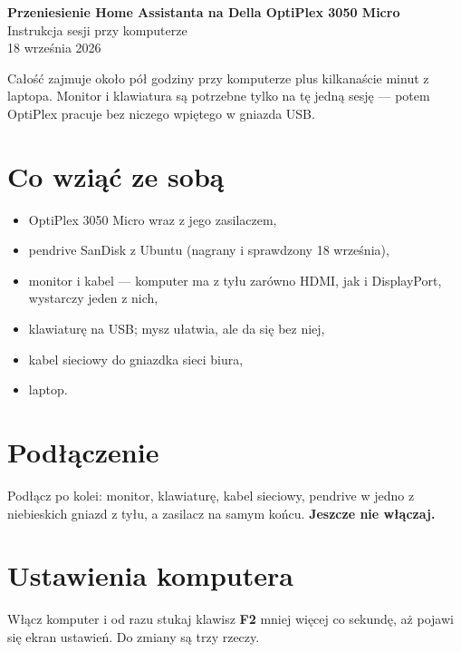 \documentclass[11pt,a4paper]{article}
\begin{document}
\begin{center}
{\LARGE\bfseries Przeniesienie Home Assistanta na Della OptiPlex 3050 Micro}\\[0.4em]
{\large Instrukcja sesji przy komputerze}\\[0.3em]
{\color{szary} 18 wrze\'snia 2026}
\end{center}

\vspace{0.6em}

\noindent
Ca\l{}o\'s\'c zajmuje oko\l{}o p\'o\l{} godziny przy komputerze plus kilkana\'scie minut z laptopa.
Monitor i klawiatura s\k{a} potrzebne tylko na t\k{e} jedn\k{a} sesj\k{e} --- potem OptiPlex pracuje
bez niczego wpi\k{e}tego w gniazda USB.

\section{Co wzi\k{a}\'c ze sob\k{a}}

\begin{itemize}
  \item OptiPlex 3050 Micro wraz z jego zasilaczem,
  \item pendrive SanDisk z Ubuntu (nagrany i sprawdzony 18 wrze\'snia),
  \item monitor i kabel --- komputer ma z ty\l{}u zar\'owno HDMI, jak i DisplayPort, wystarczy jeden z nich,
  \item klawiatur\k{e} na USB; mysz u\l{}atwia, ale da si\k{e} bez niej,
  \item kabel sieciowy do gniazdka sieci biura,
  \item laptop.
\end{itemize}

\section{Pod\l{}\k{a}czenie}

Pod\l{}\k{a}cz po kolei: monitor, klawiatur\k{e}, kabel sieciowy, pendrive w jedno z niebieskich gniazd
z ty\l{}u, a zasilacz na samym ko\'ncu. \textbf{Jeszcze nie w\l{}\k{a}czaj.}

\section{Ustawienia komputera}

W\l{}\k{a}cz komputer i od razu stukaj klawisz \textbf{F2} mniej wi\k{e}cej co sekund\k{e}, a\.z pojawi si\k{e}
ekran ustawie\'n. Do zmiany s\k{a} trzy rzeczy.
\end{document}
